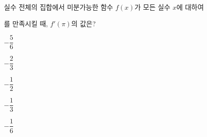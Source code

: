 실수 전체의 집합에서 미분가능한 함수 $f(x)$가 모든 실수 $x$에 대하여 \par\smallskip{}\par\smallskip\noindent 를 만족시킬 때, $f'(\pi)$의 값은?
\begin{choices32}{\rule[-3ex]{0pt}{8ex}$-\dfrac{5}{6}$}{\rule[-3ex]{0pt}{8ex}$-\dfrac{2}{3}$}{\rule[-3ex]{0pt}{8ex}$-\dfrac{1}{2}$}{\rule[-3ex]{0pt}{8ex}$-\dfrac{1}{3}$}{\rule[-3ex]{0pt}{8ex}$-\dfrac{1}{6}$}\end{choices32}
